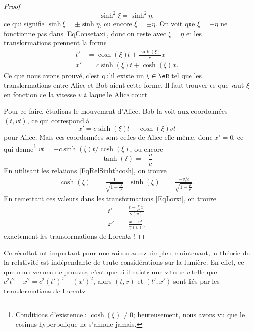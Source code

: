 \begin{proof}
	\[
		\sinh^2\xi=\sinh^2\eta,
	\]
	ce qui signifie \( \sinh\xi=\pm\sinh\eta\), ou encore \( \xi=\pm\eta\). On voit que \( \xi=-\eta\) ne fonctionne pas dans \eqref{EqConsetaxi}, donc on reste avec \( \xi=\eta\) et les transformations prennent la forme
	\begin{equation}	\label{EqLorxi}
		\begin{split}
			t'&=\cosh(\xi) t+\frac{ \sinh(\xi) }{ c }x\\
			x'&=c\sinh(\xi) t+\cosh(\xi)x.
		\end{split}
	\end{equation}
	Ce que nous avons prouvé, c'est qu'il existe un \( \xi\in\eR\) tel que les transformations entre Alice et Bob aient cette forme. Il faut trouver ce que vaut \( \xi\) en fonction de la vitesse \( v\) à laquelle Alice court.

	Pour ce faire, étudions le mouvement d'Alice. Bob la voit aux coordonnées \( (t,vt)\), ce qui correspond à
	\[
		x'=c\sinh(\xi)t+\cosh(\xi)vt
	\]
	pour Alice. Mais ces coordonnées sont celles de Alice elle-même, donc \( x'=0\), ce qui donne\footnote{Conditions d'existence : \( \cosh(\xi)\neq 0\); heureusement, nous avons vu que le cosinus hyperbolique ne s'annule jamais.} \( vt=- c\sinh(\xi)t/ \cosh(\xi)\), ou encore
	\begin{equation}
		\tanh(\xi)=-\frac{ v }{ c }
	\end{equation}
	En utilisant les relations \eqref{EqRelSinhthcosh}, on trouve
	\begin{align}
		\cosh(\xi) & =\frac{1}{ \sqrt{1-\frac{ v^2 }{ c^2 }} } & \sinh(\xi) & =\frac{ -v/c }{ \sqrt{1-\frac{ v^2 }{ c^2 }} }.
	\end{align}
	En remettant ces valeurs dans les transformations \eqref{EqLorxi}, on trouve
	\begin{align}
		t' & =\frac{ t-\frac{ v }{ c^2 }x }{ \gamma(v) } \\
		x' & =\frac{ x-vt }{ \gamma(v) },
	\end{align}
	exactement les transformations de Lorentz !

\end{proof}


Ce résultat est important pour une raison assez simple : maintenant, la théorie de la relativité est indépendante de toute considérations sur la lumière. En effet, ce que nous venons de prouver, c'est que si il existe une vitesse \( c\) telle que \( c^2t^2-x^2=c^2(t')^2-(x')^2\), alors \( (t,x)\) et \( (t',x')\) sont liés par les transformations de Lorentz.

